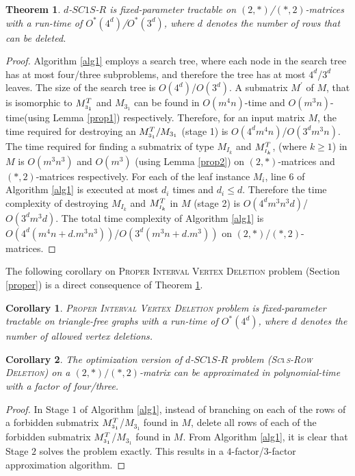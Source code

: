 \documentclass[review, 1p]{elsarticle}
\newtheorem{theorem}{Theorem}
\newtheorem{corollary}{Corollary}
\begin{document}
 \begin{theorem}\label{rest4}
$d$-$SC1S$-$R$ is fixed-parameter tractable on  $(2,*)$/$(*,2)$-matrices with a run-time of $O^{*}(4^{d})$/$O^{*}(3^{d})$, where $d$ denotes the number of rows that can be deleted.
\end{theorem}
\begin{proof}
Algorithm \ref{alg1} employs a search tree, where each node in the search tree has at most four/three subproblems, and therefore the tree has at most $4^{d}$/$3^{d}$ leaves. The size of the search tree is $O(4^{d})$/$O(3^{d})$. A submatrix $M^{'}$ of $M$, that is isomorphic to ${M^{T}_{\mathsmaller 3_{1}}}$ and $M_{3_{1}}$ can be found in $O(m^{4}n)$-time and $O(m^{3}n)$-time(using Lemma \ref{prop1}) respectively. Therefore, for an input matrix $M$, the time required for destroying an ${M^{T}_{\mathsmaller 3_{1}}}/M_{3_{1}}$ (stage 1) is $O(4^{d}m^{4}n)$/$O(3^{d}m^{3}n)$. The time required for finding a submatrix of type $M_{I_{k}}$ and $M^{T}_{\mathsmaller{I_{k}}}$, (where $k \geq 1$) in $M$ is $O(m^{3}n^{3})$ and $O(m^{3})$ (using Lemma \ref{prop2}) on $(2,*)$-matrices and $(*,2)$-matrices respectively. For each of the leaf instance $M_{i}$, line $6$ of Algorithm \ref{alg1} is executed at most $d_{i}$ times and $d_{i} \leq d$. Therefore the time complexity of destroying $M_{I_{k}}$ and $M^{T}_{\mathsmaller{I_{k}}}$ in $M$ (stage 2) is $O(4^{d}m^{3}n^{3}d)$/$O(3^{d}m^{3}d)$. The total time complexity of Algorithm \ref{alg1} is $O(4^{d}(m^{4}n + d.m^{3}n^{3}))$/$O(3^{d}(m^{3}n + d.m^{3}))$ on $(2,*)$/$(*,2)$-matrices. \end{proof}
The following corollary on \textsc{Proper Interval Vertex Deletion} problem (Section \ref{proper}) is a direct consequence of Theorem \ref{rest4}.
\begin{corollary}
\textsc{Proper Interval Vertex Deletion} problem is fixed-parameter tractable on triangle-free graphs with a run-time of $O^{*}(4^{d})$, where $d$ denotes the number of allowed vertex deletions.
\end{corollary}
 \begin{corollary}\label{cor5}
The optimization version of $d$-$SC1S$-$R$ problem \textup{(\textsc{Sc$\mathsmaller1$s-Row Deletion})} on a $(2,*)/(*,2)$-matrix can be approximated in polynomial-time with a factor of four/three.
 \end{corollary}
 \begin{proof}
 In Stage $1$ of Algorithm \ref{alg1}, instead of branching on each of the rows of a forbidden submatrix ${M^{T}_{\mathsmaller 3_{1}}}$/$M_{3_{1}}$ found in $M$, delete all rows of each of the forbidden submatrix ${M^{T}_{\mathsmaller 3_{1}}}$/$M_{3_{1}}$ found in $M$. From Algorithm \ref{alg1}, it is clear that Stage $2$ solves the problem exactly. This results in a $4$-factor/$3$-factor approximation algorithm. 
 \end{proof}
 
\end{document}
